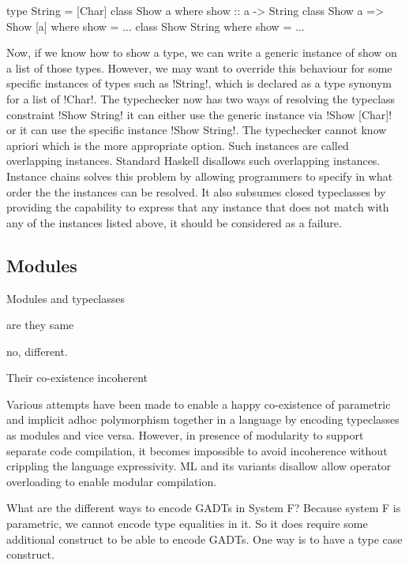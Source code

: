\documentclass[manuscript,screen,nonacm]{acmart}
\begin{document}
\begin{CenteredBox}
\begin{code}
type String = [Char]
class Show a where show :: a -> String
class Show a => Show [a] where show = ...
class Show String where show = ...
\end{code}
\end{CenteredBox}

Now, if we know how to show a type, we can write a generic instance of show on a list of those types. However, we may want to override this behaviour for some specific instances of types such as !String!, which is declared as a type synonym for a list of !Char!. The typechecker now has two ways of resolving the typeclass constraint !Show String! it can either use the generic instance via !Show [Char]! or it can use the specific instance !Show String!. The typechecker cannot know apriori which is the more appropriate option. Such instances are called overlapping instances. Standard Haskell disallows such overlapping instances. Instance chains solves this problem by allowing programmers to specify in what order the the instances can be resolved. It also subsumes closed typeclasses by providing the capability to express that any instance that does not match with any of the instances listed above, it should be considered as a failure.

\subsection{Modules}
Modules and typeclasses

are they same

no, different.

Their co-existence incoherent

Various attempts\cite{dreyer_modular_2007, wehr_ml_2008, white_modular_2014} have been made to enable a happy co-existence of parametric and implicit adhoc polymorphism together in a language by encoding typeclasses as modules and vice versa. However, in presence of modularity to support separate code compilation, it becomes impossible to avoid incoherence without crippling the language expressivity. ML and its variants\cite{milner_definition_1997,leroy_ocaml_2023} disallow allow operator overloading to enable modular compilation.

What are the different ways to encode GADTs in System F?
Because system F is parametric, we cannot encode type equalities in it. So it does require some additional construct to be able to encode GADTs. One way is to have a type case construct.
\end{document}
